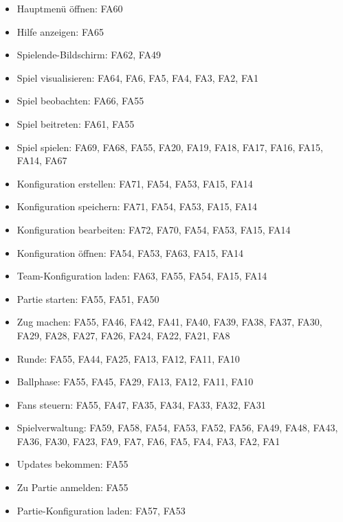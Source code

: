 \begin{itemize}
	\item
		Hauptmenü öffnen: FA60
	\item
		Hilfe anzeigen: FA65
	\item
		Spielende-Bildschirm: FA62, FA49
	\item
		Spiel visualisieren: FA64, FA6, FA5, FA4, FA3, FA2, FA1
	\item
		Spiel beobachten: FA66, FA55
	\item
		Spiel beitreten: FA61, FA55
	\item
		Spiel spielen: FA69, FA68, FA55, FA20, FA19, FA18, FA17, FA16, FA15, FA14, FA67
	\item
		Konfiguration erstellen: FA71, FA54, FA53, FA15, FA14
	\item
		Konfiguration speichern: FA71, FA54, FA53, FA15, FA14
	\item
		Konfiguration bearbeiten: FA72, FA70, FA54, FA53, FA15, FA14
	\item
		Konfiguration öffnen: FA54, FA53, FA63, FA15, FA14
	\item
		Team-Konfiguration laden: FA63, FA55, FA54, FA15, FA14
	\item
		Partie starten: FA55, FA51, FA50
	\item
		Zug machen: FA55, FA46, FA42, FA41, FA40, FA39, FA38, FA37, FA30, FA29, FA28, FA27, FA26, FA24, FA22, FA21, FA8
	\item
		Runde: FA55, FA44, FA25, FA13, FA12, FA11, FA10
	\item
		Ballphase: FA55, FA45, FA29, FA13, FA12, FA11, FA10
	\item
		Fans steuern: FA55, FA47, FA35, FA34, FA33, FA32, FA31
	\item
		Spielverwaltung: FA59, FA58, FA54, FA53, FA52, FA56, FA49, FA48, FA43, FA36, FA30, FA23, FA9, FA7, FA6, FA5, FA4, FA3, FA2, FA1
	\item
		Updates bekommen: FA55
	\item
		Zu Partie anmelden: FA55
	\item
		Partie-Konfiguration laden: FA57, FA53
	
\end{itemize}
